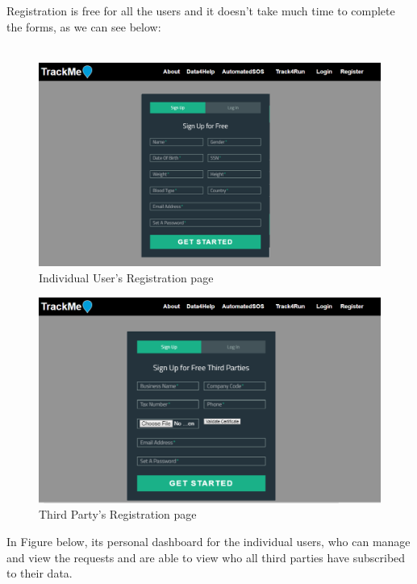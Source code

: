 \documentclass[12pt]{report}
\begin{document}
Registration is free for all the users and it doesn't take much time to complete the forms, as we can see below:\\\\

\begin{figure}[H]
\centering
\includegraphics[scale=0.35]{../Assets/Register.png}
\caption[UI: Individual User's Registration page]{Individual User's Registration page}
\label{fig:Register}
\end{figure}

\begin{figure}[H]
\centering
\includegraphics[scale=0.35]{../Assets/Register_third_party.png}
\caption[UI: Third Party's Registration page]{Third Party's Registration page}
\label{fig:Register_third_party}
\end{figure}

In Figure below, its personal dashboard for the individual users, who can manage and view the requests and are able to view who all third parties have subscribed to their data.\\\\
\end{document}
